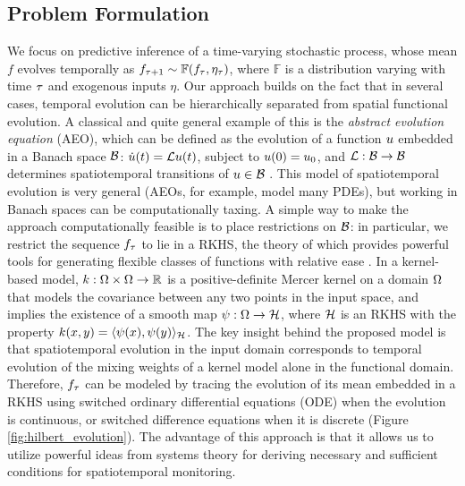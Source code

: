 \vspace{-0.1in}
\subsection{Problem Formulation}\label{sec:formulation}
We focus on predictive inference of a time-varying stochastic process, whose mean $f$ evolves temporally as $f_{\tau+1} \sim \mathbb{F}(f_{\tau},\eta_{\tau})$, where $\mathbb{F}$ is a distribution varying with time $\tau$ and exogenous inputs $\eta$. Our approach builds on the fact that in several cases, temporal evolution can be hierarchically separated from spatial functional evolution. A classical and quite general example of this is the \emph{abstract evolution equation} (AEO), which can be defined as the evolution of a function $u$ embedded in a Banach space $\mathcal{B}$: $\dot{u}(t) = \mathcal{L}u(t)$, subject to $u(0)= u_0$, and $\mathcal{L}:\mathcal{B}\to\mathcal{B}$ determines spatiotemporal transitions of $u\in\mathcal{B}$ \cite{brezis2010functional}. This model of spatiotemporal evolution is very general (AEOs, for example, model many PDEs), but working in Banach spaces can be computationally taxing.  A simple way to make the approach computationally feasible is to place restrictions on $\mathcal{B}$: in particular, we restrict the sequence $f_{\tau}$ to lie in a RKHS, the theory of which provides powerful tools for generating flexible classes of functions with relative ease \cite{RasmussenWilliams2005}.
In a kernel-based model, $k:\Omega\times\Omega\to\mathbb{R}$ is a positive-definite Mercer kernel on a domain $\Omega$ that models the covariance between any two points in the input space,  
and implies the existence of a smooth map $\psi:\Omega\to\mathcal{H}$, where $\mathcal{H}$ is an RKHS with the property $k(x,y) = \langle \psi(x),\psi(y) \rangle_{\mathcal{H}}$. The key insight behind the proposed model is that spatiotemporal evolution in the input domain corresponds to temporal evolution of the mixing weights of a kernel model alone in the functional domain. Therefore, $f_{\tau}$ can be modeled by tracing the evolution of its mean embedded in a RKHS using switched ordinary differential equations (ODE) when the evolution is continuous, or switched difference equations when it is discrete (Figure \ref{fig:hilbert_evolution}). 
The advantage of this approach is that it allows us to utilize powerful ideas from systems theory for deriving necessary and sufficient conditions for spatiotemporal monitoring. 
